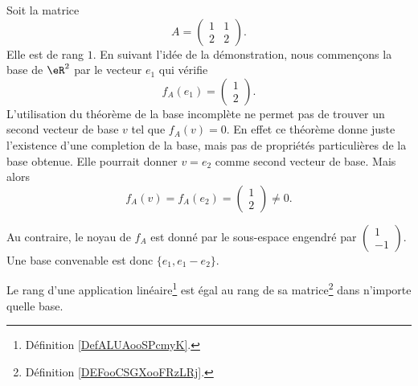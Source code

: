 \begin{example}     \label{EXooRKVQooZOGDEf}
	Soit la matrice
	\begin{equation}
		A=\begin{pmatrix}
			1 & 1 \\
			2 & 2
		\end{pmatrix}.
	\end{equation}
	Elle est de rang \( 1\). En suivant l'idée de la démonstration, nous commençons la base de \( \eR^2\) par le vecteur \( e_1\) qui vérifie
	\begin{equation}
		f_A(e_1)=\begin{pmatrix}
			1 \\
			2
		\end{pmatrix}.
	\end{equation}
	L'utilisation du théorème de la base incomplète ne permet pas de trouver un second vecteur de base \( v\) tel que \( f_A(v)=0\). En effet ce théorème donne juste l'existence d'une completion de la base, mais pas de propriétés particulières de la base obtenue. Elle pourrait donner \( v=e_2\) comme second vecteur de base. Mais alors
	\begin{equation}
		f_A(v)=f_A(e_2)=\begin{pmatrix}
			1 \\
			2
		\end{pmatrix}\neq 0.
	\end{equation}

	Au contraire, le noyau de \( f_A\) est donné par le sous-espace engendré par \( \begin{pmatrix}
		1 \\
		-1
	\end{pmatrix}\). Une base convenable est donc \( \{ e_1, e_1-e_2 \}\).
\end{example}

\begin{proposition}     \label{PROPooEGNBooIffJXc}
	Le rang d'une application linéaire\footnote{Définition \ref{DefALUAooSPcmyK}.} est égal au rang de sa matrice\footnote{Définition \ref{DEFooCSGXooFRzLRj}.} dans n'importe quelle base.
\end{proposition}

